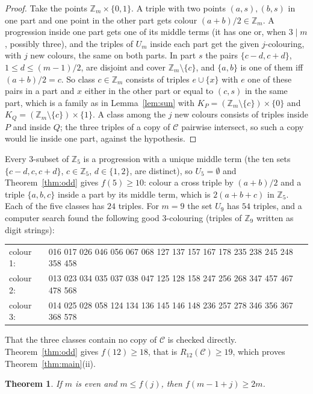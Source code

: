 \documentclass[11pt]{amsart}
\newtheorem{theorem}{Theorem}[section]
\theoremstyle{definition}
\theoremstyle{remark}
\newcommand{\Z}{\mathbb{Z}}
\newcommand{\C}{\mathcal{C}}
\begin{document}
\begin{proof}
Take the points $\Z_m\times\{0,1\}$. A triple with two points $(a,s),(b,s)$ in one part and one point in the other
part gets colour $(a+b)/2\in\Z_m$. A progression inside one part gets one of its middle terms (it has one or, when
$3\mid m$, possibly three), and the triples of $U_m$ inside each part get the given $j$-colouring, with $j$ new colours,
the same on both parts. In part $s$ the pairs $\{c-d,c+d\}$, $1\le d\le (m-1)/2$, are disjoint and cover
$\Z_m\setminus\{c\}$, and $\{a,b\}$ is one of them iff $(a+b)/2=c$. So class $c\in\Z_m$ consists of triples $e\cup\{x\}$
with $e$ one of these pairs in a part and $x$ either in the other part or equal to $(c,s)$ in the same part, which is
a family as in Lemma~\ref{lem:sun} with $K_P=(\Z_m\setminus\{c\})\times\{0\}$ and $K_Q=(\Z_m\setminus\{c\})\times\{1\}$.
A class among the $j$ new colours consists of triples inside $P$ and inside $Q$; the three triples of a copy of $\C$
pairwise intersect, so such a copy would lie inside one part, against the hypothesis.
\end{proof}

Every $3$-subset of $\Z_5$ is a progression with a unique middle term (the ten sets $\{c-d,c,c+d\}$, $c\in\Z_5$,
$d\in\{1,2\}$, are distinct), so $U_5=\emptyset$ and Theorem~\ref{thm:odd} gives $f(5)\ge10$: colour a cross triple by
$(a+b)/2$ and a triple $\{a,b,c\}$ inside a part by its middle term, which is $2(a+b+c)$ in $\Z_5$. Each of the five
classes has $24$ triples. For $m=9$ the set $U_9$ has $54$ triples, and a computer search found the following good
$3$-colouring (triples of $\Z_9$ written as digit strings):
\begin{center}\small
\begin{tabular}{ll}
colour 1: & 016 017 026 046 056 067 068 127 137 157 167 178 235 238 245 248 358 458\\
colour 2: & 013 023 034 035 037 038 047 125 128 158 247 256 268 347 457 467 478 568\\
colour 3: & 014 025 028 058 124 134 136 145 146 148 236 257 278 346 356 367 368 578
\end{tabular}
\end{center}
That the three classes contain no copy of $\C$ is checked directly. Theorem~\ref{thm:odd} gives $f(12)\ge18$, that is
$R_{12}(\C)\ge19$, which proves Theorem~\ref{thm:main}(ii).

\begin{theorem}\label{thm:two}
If $m$ is even and $m\le f(j)$, then $f(m-1+j)\ge2m$.
\end{theorem}
\end{document}
